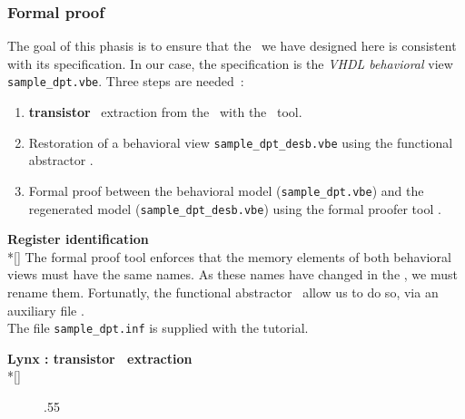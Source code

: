      \subsubsection{Formal proof}
     \begin{minipage}[t]{\textwidth}
       \forceindent
         The goal of this phasis is to ensure that the \datapath\ we have
       designed here is consistent with its specification. In our case,
       the specification is the {\it VHDL behavioral} view
       {\tt sample\_dpt.vbe}. Three steps are needed~:
       \begin{enumerate}
         \item
            {\bf transistor} \netlist\ extraction from the \layout\ with
            the \lynx\ tool.
         \item
            Restoration of a behavioral view {\tt sample\_dpt\_desb.vbe}
            using the functional abstractor \desb.
         \item
            Formal proof between the behavioral model ({\tt sample\_dpt.vbe})
            and the regenerated model ({\tt sample\_dpt\_desb.vbe}) using
            the formal proofer tool \proof.
       \end{enumerate}
       \bigskip
     \end{minipage}
     \begin{minipage}[t]{\textwidth}
       {\bf Register identification}
       \\*[\bigskipamount]
       \forceindent
         The formal proof tool enforces that the memory elements of both
       behavioral views must have the same names. As these names have
       changed in the \layout, we must rename them. Fortunatly, the
       functional abstractor \desb\ allow us to do so, via an
       auxiliary file \desbfile.\\
       \forceindent
         The file {\tt sample\_dpt.inf} is supplied with the tutorial.
     \end{minipage}
     \begin{minipage}[t]{\textwidth}
       {\bf Lynx : transistor \netlist\ extraction }
       \\*[\bigskipamount]
       \forceindent
       \begin{figure}[H]
         \begin{center}
           \leavevmode\epsfxsize.55\textwidth{}
         \end{center}
       \end{figure}
     \end{minipage}
